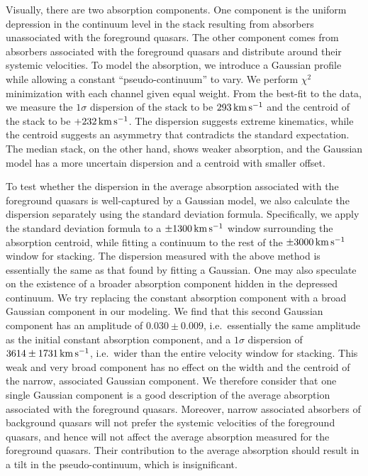 \documentclass[iop]{emulateapj}
\begin{document}
Visually, there are two absorption components. One component is the uniform depression in the
continuum level in the stack resulting from absorbers unassociated with the foreground
quasars. The other component comes from absorbers associated with the foreground quasars and
distribute around their systemic velocities. To model the absorption, we introduce
a Gaussian profile while allowing a constant ``pseudo-continuum'' to vary.
We perform $\chi^2$ minimization with each channel given equal weight. From the best-fit
to the data, we measure
the $1\sigma$ dispersion of the stack to be $293\,{\rm km\,s^{-1}}$ and the centroid of the
 stack to be $+232\,{\rm km\,s^{-1}}$. The dispersion suggests extreme kinematics, while
the centroid suggests an asymmetry that contradicts the standard expectation.
The median
stack, on the other hand, shows weaker absorption,
and the Gaussian model has a more uncertain dispersion and a centroid with smaller offset.

To test whether the dispersion in the average absorption associated with the foreground quasars is
well-captured by a Gaussian model, we also calculate the dispersion separately using the standard
deviation formula. Specifically, we apply the standard deviation formula to a $\pm1300\,{\rm km\,s^{-1}}$
window surrounding the absorption centroid, while fitting a continuum to the rest of the
$\pm3000\,{\rm km\,s^{-1}}$ window for stacking. The
dispersion measured with the above method is essentially the same as that found by fitting a Gaussian.
One may also speculate on the existence of a broader absorption component hidden in the depressed
continuum. We try replacing the constant absorption component with a broad Gaussian component in our
modeling. We find that this second Gaussian component has
an amplitude of $0.030\pm0.009$, i.e.\ essentially the same amplitude as the initial
constant absorption component, and a $1\sigma$ dispersion of $3614\pm1731\,{\rm km\,s^{-1}}$, i.e.\ wider
than the entire velocity window for stacking.
This weak and very broad component has no effect on the width and the centroid of the narrow,
associated Gaussian component. We therefore consider that one single Gaussian component is a good
description of the average absorption associated with the foreground quasars.
Moreover, narrow associated absorbers of background quasars will not prefer the systemic velocities of
the foreground quasars, and hence will not affect the average absorption measured for the foreground
quasars. Their contribution to the average absorption should result in a tilt in the
pseudo-continuum, which is insignificant.
\end{document}
